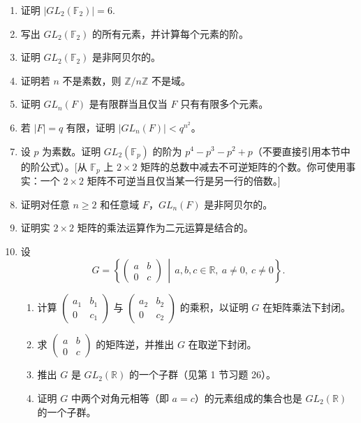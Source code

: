 \begin{enumerate}
\item 证明 \( |GL_2(\mathbb{F}_2)| = 6 \).

\item 写出 \( GL_2(\mathbb{F}_2) \) 的所有元素，并计算每个元素的阶。

\item 证明 \( GL_2(\mathbb{F}_2) \) 是非阿贝尔的。

\item 证明若 \( n \) 不是素数，则 \( \mathbb{Z}/n\mathbb{Z} \) 不是域。

\item 证明 \( GL_n(F) \) 是有限群当且仅当 \( F \) 只有有限多个元素。

\item 若 \( |F| = q \) 有限，证明 \( |GL_n(F)| < q^{n^2} \)。

\item 设 \( p \) 为素数。证明 \( GL_2(\mathbb{F}_p) \) 的阶为 \( p^4 - p^3 - p^2 + p \)（不要直接引用本节中的阶公式）。[从 \( \mathbb{F}_p \) 上 \( 2 \times 2 \) 矩阵的总数中减去不可逆矩阵的个数。你可使用事实：一个 \( 2 \times 2 \) 矩阵不可逆当且仅当某一行是另一行的倍数。]

\item 证明对任意 \( n \geq 2 \) 和任意域 \( F \)，\( GL_n(F) \) 是非阿贝尔的。

\item 证明实 \( 2 \times 2 \) 矩阵的乘法运算作为二元运算是结合的。

\item 设
\[
G = \left\{ \begin{pmatrix} a & b \\ 0 & c \end{pmatrix} \,\middle|\, a, b, c \in \mathbb{R},\ a \neq 0,\ c \neq 0 \right\}.
\]
\begin{enumerate}[label=(\alph*)]
\item 计算 \( \begin{pmatrix} a_1 & b_1 \\ 0 & c_1 \end{pmatrix} \) 与 \( \begin{pmatrix} a_2 & b_2 \\ 0 & c_2 \end{pmatrix} \) 的乘积，以证明 \( G \) 在矩阵乘法下封闭。
\item 求 \( \begin{pmatrix} a & b \\ 0 & c \end{pmatrix} \) 的矩阵逆，并推出 \( G \) 在取逆下封闭。
\item 推出 \( G \) 是 \( GL_2(\mathbb{R}) \) 的一个子群（见第 1 节习题 26）。
\item 证明 \( G \) 中两个对角元相等（即 \( a = c \)）的元素组成的集合也是 \( GL_2(\mathbb{R}) \) 的一个子群。
\end{enumerate}


\end{enumerate}
